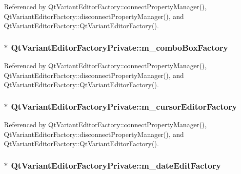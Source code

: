 Referenced by Qt\+Variant\+Editor\+Factory\+::connect\+Property\+Manager(), Qt\+Variant\+Editor\+Factory\+::disconnect\+Property\+Manager(), and Qt\+Variant\+Editor\+Factory\+::\+Qt\+Variant\+Editor\+Factory().

\subsubsection[{m\+\_\+combo\+Box\+Factory}]{$\ast$ Qt\+Variant\+Editor\+Factory\+Private\+::m\+\_\+combo\+Box\+Factory}\label{classQtVariantEditorFactoryPrivate_a0f1810194d8c03c1c098093e46b3b2e2}


Referenced by Qt\+Variant\+Editor\+Factory\+::connect\+Property\+Manager(), Qt\+Variant\+Editor\+Factory\+::disconnect\+Property\+Manager(), and Qt\+Variant\+Editor\+Factory\+::\+Qt\+Variant\+Editor\+Factory().

\subsubsection[{m\+\_\+cursor\+Editor\+Factory}]{$\ast$ Qt\+Variant\+Editor\+Factory\+Private\+::m\+\_\+cursor\+Editor\+Factory}\label{classQtVariantEditorFactoryPrivate_a48908ed81e3fabdf314cb9128ca5f61d}


Referenced by Qt\+Variant\+Editor\+Factory\+::connect\+Property\+Manager(), Qt\+Variant\+Editor\+Factory\+::disconnect\+Property\+Manager(), and Qt\+Variant\+Editor\+Factory\+::\+Qt\+Variant\+Editor\+Factory().

\subsubsection[{m\+\_\+date\+Edit\+Factory}]{$\ast$ Qt\+Variant\+Editor\+Factory\+Private\+::m\+\_\+date\+Edit\+Factory}\label{classQtVariantEditorFactoryPrivate_a88f56eadd017c2a3a6fad0e4681e8787}


